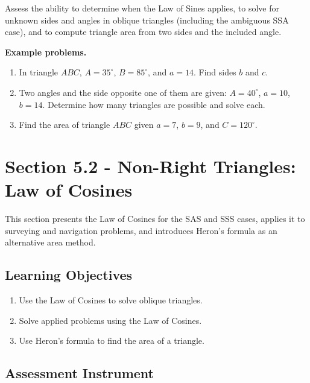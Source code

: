 Assess the ability to determine when the Law of Sines applies, to solve for unknown sides
and angles in oblique triangles (including the ambiguous SSA case), and to compute
triangle area from two sides and the included angle.

\textbf{Example problems.}
\begin{enumerate}
    \item In triangle $ABC$, $A = 35^{\circ}$, $B = 85^{\circ}$, and $a = 14$. Find sides $b$ and $c$.
    \item Two angles and the side opposite one of them are given: $A = 40^{\circ}$, $a = 10$, $b = 14$. Determine how many triangles are possible and solve each.
    \item Find the area of triangle $ABC$ given $a = 7$, $b = 9$, and $C = 120^{\circ}$.
\end{enumerate}

\section{Section 5.2 - Non-Right Triangles: Law of Cosines}
\label{sec:sect-800a}

This section presents the Law of Cosines for the SAS and SSS cases, applies it to
surveying and navigation problems, and introduces Heron's formula as an alternative area
method.

\subsection{Learning Objectives}
\label{ssec:lear-fe6e}

\begin{enumerate}
    \item Use the Law of Cosines to solve oblique triangles.
    \item Solve applied problems using the Law of Cosines.
    \item Use Heron's formula to find the area of a triangle.
\end{enumerate}

\subsection{Assessment Instrument}
\label{ssec:asse-3669}

